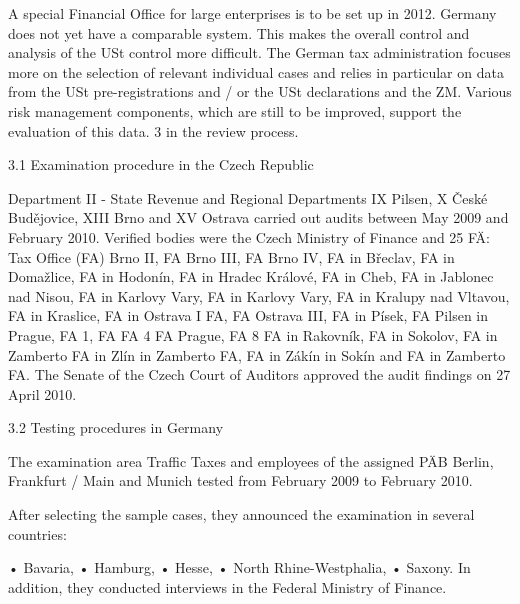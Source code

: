 \documentclass[10pt]{article}
\begin{document}
A special Financial Office for large enterprises is to be set up in 2012.
Germany does not yet have a comparable system. This makes the overall control and analysis of the USt control more difficult.
The German tax administration focuses more on the selection of relevant individual cases and relies in particular on data from the USt pre-registrations and / or the USt declarations and the ZM.
Various risk management components, which are still to be improved, support the evaluation of this data.
3 in the review process.


3.1 Examination procedure in the Czech Republic

Department II - State Revenue and Regional Departments IX Pilsen, X České Budějovice, XIII Brno and XV Ostrava carried out audits between May 2009 and February 2010.
Verified bodies were the Czech Ministry of Finance and 25 FÄ: Tax Office (FA) Brno II, FA Brno III, FA Brno IV, FA in Břeclav, FA in Domažlice, FA in Hodonín, FA in Hradec Králové, FA in Cheb, FA in Jablonec nad Nisou, FA in Karlovy Vary, FA in Karlovy Vary, FA in Kralupy nad Vltavou, FA in Kraslice, FA in Ostrava I FA, FA Ostrava III, FA in Písek, FA Pilsen in Prague, FA 1, FA FA 4 FA Prague, FA 8 FA in Rakovník, FA in Sokolov, FA in Zamberto FA in Zlín in Zamberto FA, FA in Zákín in Sokín and FA in Zamberto FA.
The Senate of the Czech Court of Auditors approved the audit findings on 27 April 2010.


3.2 Testing procedures in Germany

The examination area Traffic Taxes and employees of the assigned PÄB Berlin, Frankfurt / Main and Munich tested from February 2009 to February 2010.


After selecting the sample cases, they announced the examination in several countries:

• Bavaria, • Hamburg, • Hesse, • North Rhine-Westphalia, • Saxony. In addition, they conducted interviews in the Federal Ministry of Finance.
\end{document}

